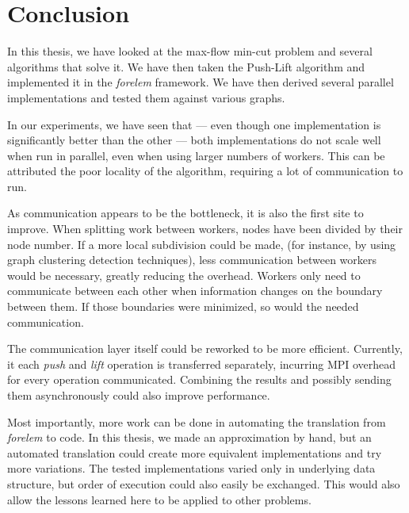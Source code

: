 \chapter{Conclusion}

In this thesis, we have looked at the max-flow min-cut problem and several algorithms that solve it. We have then taken the Push-Lift algorithm and implemented it in the \emph{forelem} framework. We have then derived several parallel implementations and tested them against various graphs.

In our experiments, we have seen that --- even though one implementation is significantly better than the other --- both implementations do not scale well when run in parallel, even when using larger numbers of workers. This can be attributed the poor locality of the algorithm, requiring a lot of communication to run.

As communication appears to be the bottleneck, it is also the first site to improve. When splitting work between workers, nodes have been divided by their node number. If a more local subdivision could be made, (for instance, by using graph clustering detection techniques), less communication between workers would be necessary, greatly reducing the overhead. Workers only need to communicate between each other when information changes on the boundary between them. If those boundaries were minimized, so would the needed communication. 

The communication layer itself could be reworked to be more efficient. Currently, it each \emph{push} and \emph{lift} operation is transferred separately, incurring MPI overhead for every operation communicated. Combining the results and possibly sending them asynchronously could also improve performance.

Most importantly, more work can be done in automating the translation from \emph{forelem} to code. In this thesis, we made an approximation by hand, but an automated translation could create more equivalent implementations and try more variations. The tested implementations varied only in underlying data structure, but order of execution could also easily be exchanged. This would also allow the lessons learned here to be applied to other problems.
